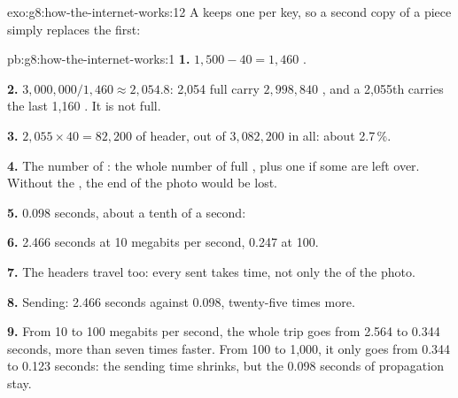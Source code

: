 \begin{solution}{exo:g8:how-the-internet-works:12}
A  keeps one  per key, so a second copy of a piece simply
replaces the first:

\label{lst:g8:how-the-internet-works:sol-reassemble}
\end{solution}

\begin{solution}{pb:g8:how-the-internet-works:1}
\textbf{1.} $1{,}500 - 40 = 1{,}460$ .

\textbf{2.} $3{,}000{,}000 / 1{,}460 \approx 2{,}054.8$: 2,054 full 
carry $2{,}998{,}840$ , and a 2,055th carries the last 1,160 . It is
not full.

\textbf{3.} $2{,}055 \times 40 = 82{,}200$  of header, out of
$3{,}082{,}200$  in all: about 2.7\,\%.

\textbf{4.} The number of : the whole number of full , plus one
if some  are left over. Without the , the end of the photo would
be lost.

\textbf{5.} 0.098 seconds, about a tenth of a second:

\label{out:g8:how-the-internet-works:photo}

\textbf{6.} 2.466 seconds at 10 megabits per second, 0.247 at 100.

\textbf{7.} The headers travel too: every  sent takes time, not only the
 of the photo.

\textbf{8.} Sending: 2.466 seconds against 0.098, twenty-five times more.

\textbf{9.} From 10 to 100 megabits per second, the whole trip goes from 2.564
to 0.344 seconds, more than seven times faster. From 100 to 1,000, it only
goes from 0.344 to 0.123 seconds: the sending time shrinks, but the 0.098
seconds of propagation stay.


\end{solution}
